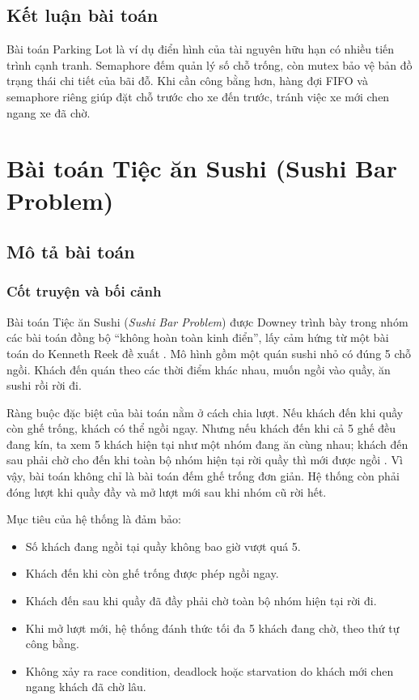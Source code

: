\subsection{Kết luận bài toán}

Bài toán Parking Lot là ví dụ điển hình của tài nguyên hữu hạn có nhiều tiến
trình cạnh tranh. Semaphore đếm quản lý số chỗ trống, còn mutex bảo vệ bản đồ
trạng thái chi tiết của bãi đỗ. Khi cần công bằng hơn, hàng đợi FIFO và
semaphore riêng giúp đặt chỗ trước cho xe đến trước, tránh việc xe mới chen
ngang xe đã chờ.

\newpage
\section{Bài toán Tiệc ăn Sushi (Sushi Bar Problem)}

\subsection{Mô tả bài toán}

\subsubsection*{Cốt truyện và bối cảnh}

Bài toán Tiệc ăn Sushi (\textit{Sushi Bar Problem}) được Downey trình bày
trong nhóm các bài toán đồng bộ ``không hoàn toàn kinh điển'', lấy cảm hứng
từ một bài toán do Kenneth Reek đề xuất \cite[Sec.~7.1]{downey2016}. Mô hình
gồm một quán sushi nhỏ có đúng 5 chỗ ngồi. Khách đến quán theo các thời điểm
khác nhau, muốn ngồi vào quầy, ăn sushi rồi rời đi.

Ràng buộc đặc biệt của bài toán nằm ở cách chia lượt. Nếu khách đến khi quầy
còn ghế trống, khách có thể ngồi ngay. Nhưng nếu khách đến khi cả 5 ghế đều
đang kín, ta xem 5 khách hiện tại như một nhóm đang ăn cùng nhau; khách đến
sau phải chờ cho đến khi toàn bộ nhóm hiện tại rời quầy thì mới được ngồi
\cite[Sec.~7.1]{downey2016}. Vì vậy, bài toán không chỉ là bài toán đếm ghế
trống đơn giản. Hệ thống còn phải đóng lượt khi quầy đầy và mở lượt mới sau
khi nhóm cũ rời hết.

Mục tiêu của hệ thống là đảm bảo:

\begin{itemize}
    \item Số khách đang ngồi tại quầy không bao giờ vượt quá 5.
    \item Khách đến khi còn ghế trống được phép ngồi ngay.
    \item Khách đến sau khi quầy đã đầy phải chờ toàn bộ nhóm hiện tại rời đi.
    \item Khi mở lượt mới, hệ thống đánh thức tối đa 5 khách đang chờ, theo
    thứ tự công bằng.
    \item Không xảy ra race condition, deadlock hoặc starvation do khách mới
    chen ngang khách đã chờ lâu.
\end{itemize}

